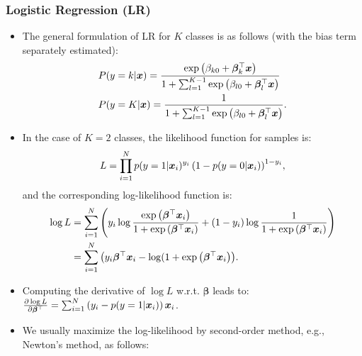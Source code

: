         \subsubsection{Logistic Regression (LR)}
            \begin{itemize}
                \item The general formulation of LR for $K$ classes is as follows (with the bias term separately estimated):
                    \begin{equation}
                        \begin{aligned}
                            & P(y=k | \bm{x}) = \frac{  \text{exp}\left( \beta_{k0} + \bm{\beta}_k^\top \bm{x}  \right) }{1 + \sum_{l=1}^{K-1}{ \text{exp}\left( \beta_{l0} + \bm{\beta}_l^\top \bm{x}  \right)  }} \\
                            & P(y=K | \bm{x}) = \frac{1}{1 + \sum_{l=1}^{K-1}{ \text{exp}\left( \beta_{l0} + \bm{\beta}_l^\top \bm{x}  \right)  }}.
                        \end{aligned}
                    \end{equation}
                \item In the case of $K=2$ classes, the likelihood function for \ndata samples is:
                    \begin{equation}
                        L = \prod_{i=1}^{N}{p(y=1 | \bm{x}_i)^{y_i} \left( 1-p(y=0 | \bm{x}_i) \right)^{1-y_i} },
                    \end{equation}
                and the corresponding log-likelihood function is:
                    \begin{equation}
                        \begin{aligned}
                        \log L & = \sum_{i=1}^{N}{\left( y_i \log\frac{ \text{exp}\left( \bm{\beta}^\top\bm{x}_i \right) }{1 +  \text{exp}\left( \bm{\beta}^\top \bm{x}_i  \right) }  + (1-y_i)\log\frac{1}{1+ \text{exp}\left( \bm{\beta}^\top \bm{x}_i \right) } \right) }  \\
                              & = \sum_{i=1}^{N}{\left( y_i \bm{\beta}^\top \bm{x}_i -\log(1 +  \text{exp}\left( \bm{\beta}^\top \bm{x}_i \right)  \right)}.
                        \end{aligned}
                    \end{equation}
                \item Computing the derivative of $\log L$ w.r.t. $\bm{\beta}$ leads to: 
                $\frac{\partial \log L}{\partial \bm{\beta}^\top} = \sum_{i=1}^{N}{\left( y_i - p(y=1|\bm{x}_i) \right) \bm{x}_i }$.
                \item We usually maximize the log-likelihood by second-order method, e.g., Newton's method, as follows:

\end{itemize}
